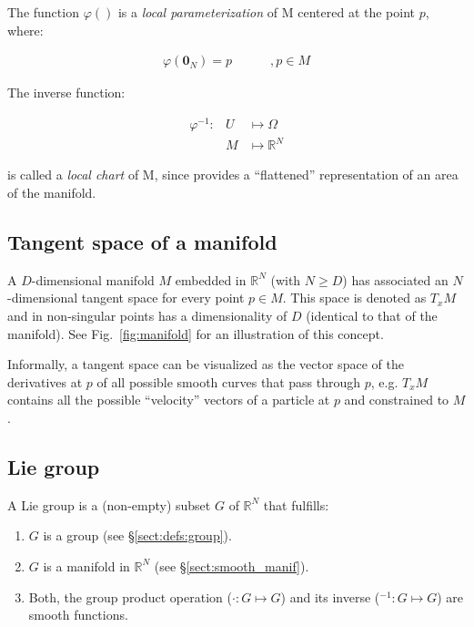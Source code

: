 \documentclass[a4paper,11pt]{report}
\begin{document}
The function $\varphi()$ is a \emph{local parameterization} of M
centered at the point $p$, where:

\begin{eqnarray}
 \varphi(\mathbf{0}_N) = p \quad  \quad  \quad  , p \in M
\end{eqnarray}

The inverse function:

\begin{eqnarray}
 \varphi^{-1}: & U & \mapsto \Omega  \\
              & M  &  \mapsto \mathbb{R}^N
\end{eqnarray}

\noindent is called a \emph{local chart} of M, since provides a ``flattened''
representation of an area of the manifold.



\subsection{Tangent space of a manifold}
\label{sect:tang_space}

A $D$-dimensional manifold $M$ embedded in $\mathbb{R}^N$
(with $N \geq D$) has associated an $N$-dimensional tangent space
for every point $p \in M$.
This space is denoted as $T_x M$ and in non-singular points
has a dimensionality of $D$ (identical to that of the manifold).
See Fig.~\ref{fig:manifold} for an illustration of this concept.

Informally, a tangent space can be visualized as the vector space
of the derivatives at $p$ of all possible smooth curves that pass
through $p$, e.g. $T_x M$ contains all the possible
``velocity'' vectors of a particle at $p$ and constrained to $M$.



\subsection{Lie group}
\label{sect:lie_group_def}

A Lie group is a (non-empty) subset $G$ of $\mathbb{R}^N$ that fulfills:
\begin{enumerate}
 \item $G$ is a group (see \S\ref{sect:defs:group}).
 \item $G$ is a manifold in $\mathbb{R}^N$ (see \S\ref{sect:smooth_manif}).
 \item Both, the group product operation ($\cdot: G \mapsto G$)
and its inverse (${}^{-1}: G \mapsto G$) are smooth functions.
\end{enumerate}
\end{document}

